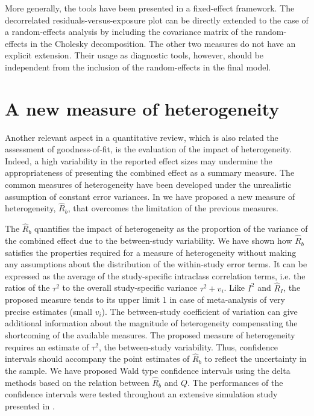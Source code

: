 \documentclass[11pt,a4paper,twoside,openany]{book}\usepackage{knitr}
\begin{document}
{{More generally, the tools have been presented in a fixed-effect framework. The decorrelated residuals-versus-exposure plot can be directly extended to the case of a random-effects analysis by including the covariance matrix of the random-effects in the Cholesky decomposition. The other two measures do not have an explicit extension. Their usage as diagnostic tools, however, should be independent from the inclusion of the random-effects in the final model.


\section{A new measure of heterogeneity}

Another relevant aspect in a quantitative review, which is also related the assessment of goodness-of-fit, is the evaluation of the impact of heterogeneity. Indeed, a high variability in the reported effect sizes may undermine the appropriateness of presenting the combined effect as a summary measure. The common measures of heterogeneity have been developed under the unrealistic assumption of constant error variances. In  we have proposed a new measure of heterogeneity, $\hat R_b$, that overcomes the limitation of the previous measures.

The $\hat R_b$ quantifies the impact of heterogeneity as the proportion of the variance of the combined effect due to the between-study variability. We have shown how $\hat R_b$ satisfies the properties required for a measure of heterogeneity without making any assumptions about the distribution of the within-study error terms. It can be expressed as the average of the study-specific intraclass correlation terms, i.e. the ratios of the $\tau^2$ to the overall study-specific variance $\tau^2 + v_i$. Like $I^2$ and $\hat R_I$, the proposed measure tends to its upper limit 1 in case of meta-analysis of very precise estimates (small $v_i$). The between-study coefficient of variation can give additional information about the magnitude of heterogeneity compensating the shortcoming of the available measures.
The proposed measure of heterogeneity requires an estimate of $\tau^2$, the between-study variability. Thus, confidence intervals should accompany the point estimates of $\hat R_b$ to reflect the uncertainty in the sample. We have proposed Wald type confidence intervals using the delta methods based on the relation between $\hat R_b$ and $Q$. The performances of the confidence intervals were tested throughout an extensive simulation study presented in .

}}
\end{document}
